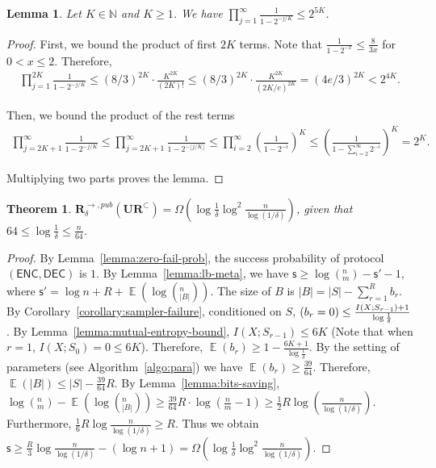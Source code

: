 \documentclass[11pt]{article}
\newtheorem{theorem}{Theorem}
\newtheorem{lemma}{Lemma}
\DeclareMathOperator*{\E}{\mathbb{E}}
\let\Pr\relax
\DeclareMathOperator*{\Pr}{\mathbb{P}}
\newcommand{\enc}{\textsf{ENC}\xspace}
\newcommand{\dec}{\textsf{DEC}\xspace}
\newcommand{\s}{\textsf{s}\xspace}
\newcommand{\ur}{\mathbf{UR}\xspace}
\newcommand{\randcom}{\mathbf{R}}
\begin{document}
\begin{lemma}\label{lemma:Pochhammer}
  Let $K\in \mathbb{N}$ and $K\ge 1$. We have $\prod_{j=1}^{\infty} \frac{1}{1-2^{-j/K}}\le 2^{5K}$.
\end{lemma}

\begin{proof}
  First, we bound the product of first $2K$ terms. Note that $\frac{1}{1-2^{-x}}\le \frac{8}{3x}$ for $0<x\le 2$. Therefore, 
  \begin{align}
    \prod_{j=1}^{2K}\frac{1}{1-2^{-j/K}}
    \le (8/3)^{2K}\cdot \frac{K^{2K}}{(2K)!}
    \le (8/3)^{2K}\cdot \frac{K^{2K}}{(2K/e)^{2K}}
    = (4e/3)^{2K}
    < 2^{4K}. 
  \end{align}
  
  Then, we bound the product of the rest terms
  \begin{align}
    \prod_{j=2K+1}^{\infty}\frac{1}{1-2^{-j/K}} 
    \le \prod_{j=2K+1}^{\infty}\frac{1}{1-2^{-\lfloor j/K \rfloor}} 
    \le \prod_{i=2}^{\infty}\left( \frac{1}{1-2^{-i}}\right)^K 
    \le \left( \frac{1}{1-\sum_{i=2}^{\infty}2^{-i}}\right)^K
    = 2^K.
  \end{align}
  
  Multiplying two parts proves the lemma.
\end{proof}

\begin{theorem}
  $\randcom^{\rightarrow,pub}_\delta(\ur^\subset) = \Omega(\log \frac{1}{\delta}\log^2 \frac{n}{\log (1/\delta)} )$, given that $64 \le \log \frac{1}{\delta} \le \frac{n}{64}$.
\end{theorem}

\begin{proof}
  By Lemma~\ref{lemma:zero-fail-prob}, the success probability of protocol $(\enc,\dec)$ is $1$. 
  By Lemma~\ref{lemma:lb-meta}, we have $\s\ge \log (^n_m) - \s' -1$, where $\s'=\log n + R+ \E(\log (^n_{|B|}))$. 
  The size of $B$ is $|B|=|S|-\sum_{r=1}^{R}{b_r}$.
  By Corollary~\ref{corollary:sampler-failure}, conditioned on $S$, $\Pr(b_r=0)\le \frac{I(X;S_{r-1})+1}{\log\frac{1}{\delta}}$. 
  By Lemma~\ref{lemma:mutual-entropy-bound}, $I(X;S_{r-1})\le 6K$ (Note that when $r=1$, $I(X;S_0)=0\le 6K$). 
  Therefore, $\E(b_r)\ge 1-\frac{6K+1}{\log\frac{1}{\delta}}$.
  By the setting of parameters (see Algorithm~\ref{algo:para}) we have $\E(b_r)\ge \frac{39}{64}$. Therefore, $\E(|B|)\le |S|-\frac{39}{64}R$. 
  By Lemma~\ref{lemma:bits-saving}, $\log (^n_m)-\E(\log (^n_{|B|}))\ge \frac{39}{64}R\cdot \log (\frac{n}{m}-1) \ge \frac{1}{2}R\log (\frac{n}{\log(1/\delta)})$. 
  Furthermore, $\frac{1}{6}R\log \frac{n}{\log (1/\delta)} \ge R$.
  Thus we obtain $\s \ge \frac{R}{3}\log \frac{n}{\log(1/\delta)} -(\log n + 1)  =\Omega(\log \frac{1}{\delta}\log^2 \frac{n}{\log (1/\delta)} )$.
\end{proof}
\end{document}

